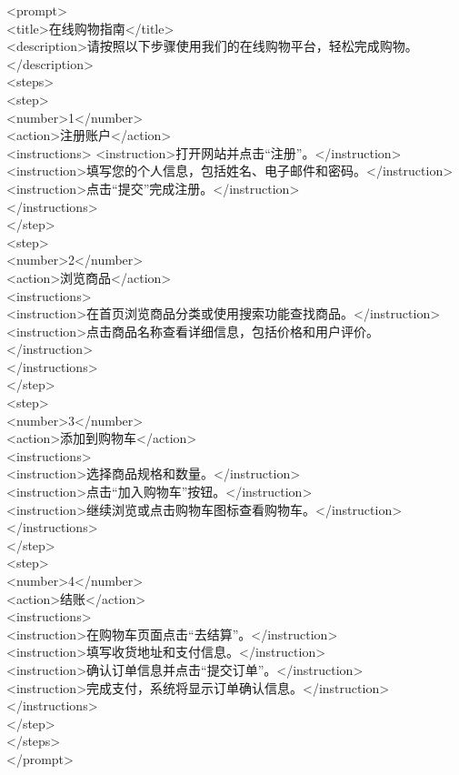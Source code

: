 \documentclass[12pt]{book}
\begin{document}
\begin{tcolorbox}
<prompt>\\
<title>在线购物指南</title>\\
<description>请按照以下步骤使用我们的在线购物平台，轻松完成购物。</description>\\
<steps>\\
<step>\\
<number>1</number>\\
<action>注册账户</action>\\
<instructions>
<instruction>打开网站并点击“注册”。</instruction>\\
<instruction>填写您的个人信息，包括姓名、电子邮件和密码。</instruction>\\
<instruction>点击“提交”完成注册。</instruction>\\
</instructions>\\
</step>\\
<step>\\
<number>2</number>\\
<action>浏览商品</action>\\
<instructions>\\
<instruction>在首页浏览商品分类或使用搜索功能查找商品。</instruction>\\
<instruction>点击商品名称查看详细信息，包括价格和用户评价。</instruction>\\
</instructions>\\
</step>\\
<step>\\
<number>3</number>\\
<action>添加到购物车</action>\\
<instructions>\\
<instruction>选择商品规格和数量。</instruction>\\
<instruction>点击“加入购物车”按钮。</instruction>\\
<instruction>继续浏览或点击购物车图标查看购物车。</instruction>\\
</instructions>\\
</step>\\
<step>\\
<number>4</number>\\
<action>结账</action>\\
<instructions>\\
<instruction>在购物车页面点击“去结算”。</instruction>\\
<instruction>填写收货地址和支付信息。</instruction>\\
<instruction>确认订单信息并点击“提交订单”。</instruction>\\
<instruction>完成支付，系统将显示订单确认信息。</instruction>\\
</instructions>\\
</step>\\
</steps>\\
</prompt>\\

\end{tcolorbox}	
\end{document}

